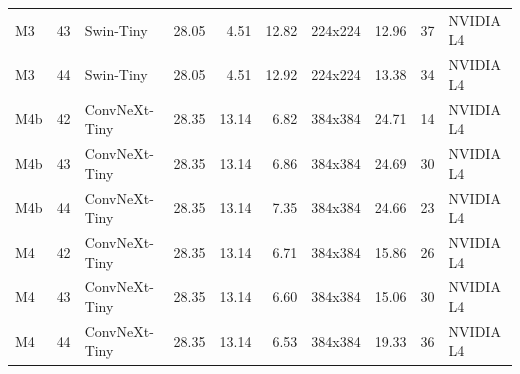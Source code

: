 \begin{tabular}{lrlrrrlrrl}
M3 & 43 & Swin-Tiny & 28.05 & 4.51 & 12.82 & 224x224 & 12.96 & 37 & NVIDIA L4 \\
M3 & 44 & Swin-Tiny & 28.05 & 4.51 & 12.92 & 224x224 & 13.38 & 34 & NVIDIA L4 \\
M4b & 42 & ConvNeXt-Tiny & 28.35 & 13.14 & 6.82 & 384x384 & 24.71 & 14 & NVIDIA L4 \\
M4b & 43 & ConvNeXt-Tiny & 28.35 & 13.14 & 6.86 & 384x384 & 24.69 & 30 & NVIDIA L4 \\
M4b & 44 & ConvNeXt-Tiny & 28.35 & 13.14 & 7.35 & 384x384 & 24.66 & 23 & NVIDIA L4 \\
M4 & 42 & ConvNeXt-Tiny & 28.35 & 13.14 & 6.71 & 384x384 & 15.86 & 26 & NVIDIA L4 \\
M4 & 43 & ConvNeXt-Tiny & 28.35 & 13.14 & 6.60 & 384x384 & 15.06 & 30 & NVIDIA L4 \\
M4 & 44 & ConvNeXt-Tiny & 28.35 & 13.14 & 6.53 & 384x384 & 19.33 & 36 & NVIDIA L4 \\
\bottomrule
\end{tabular}
